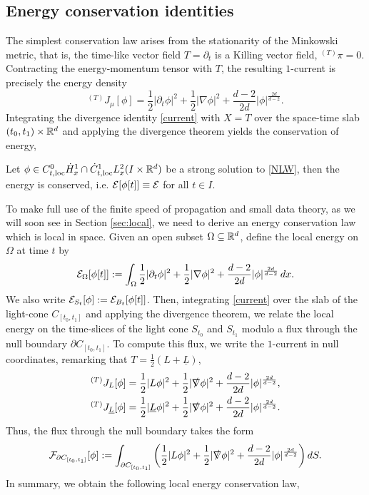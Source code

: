 	
\subsection{Energy conservation identities}
	
The simplest conservation law arises from the stationarity of the Minkowski metric, that is, the time-like vector field $T = \partial_t$ is a Killing vector field, $^{(T)} \pi = 0$. Contracting the energy-momentum tensor with $T$, the resulting $1$-current is precisely the energy density
	\[
		^{(T)} J_\mu [\phi]
			= \frac12 |\partial_t \phi|^2 + \frac12 |\nabla \phi|^2 + \frac{d - 2}{2d} |\phi|^{\frac{2d}{d - 2}} .
	\]
Integrating the divergence identity \eqref{current} with $X = T$ over the space-time slab $(t_0, t_1) \times \mathbb R^d$ and applying the divergence theorem yields the conservation of energy,	

\begin{proposition}
	Let $\phi \in C^0_{t, \mathrm{loc}} \dot H^1_x \cap \dot C^1_{t, \mathrm{loc}} L^2_x (I \times \mathbb R^d)$ be a strong solution to \eqref{NLW}, then the energy is conserved, i.e. $\mathcal E[\phi[t]] \equiv \mathcal E$ for all $t \in I$. 
\end{proposition}
	
To make full use of the finite speed of propagation and small data theory, as we will soon see in Section \ref{sec:local}, we need to derive an energy conservation law which is local in space. Given an open subset $\Omega \subseteq \mathbb R^d$, define the local energy on $\Omega$ at time $t$ by
	\[
		\mathcal E_\Omega [\phi[t]] 
			:= \int_\Omega \frac12 |\partial_t \phi|^2 + \frac12 |\nabla \phi|^2 +  \frac{d - 2}{2d} |\phi|^{\frac{2d}{d - 2}} \, dx.
	\]	
We also write $\mathcal E_{S_t} [\phi] := \mathcal E_{B_t} [\phi[t]]$. Then, integrating \eqref{current} over the slab of the light-cone $C_{[t_0, t_1]}$ and applying the divergence theorem, we relate the local energy on the time-slices of the light cone $S_{t_0}$ and $S_{t_1}$ modulo a flux through the null boundary $\partial C_{[t_0, t_1]}$. To compute this flux, we write the $1$-current in null coordinates, remarking that $T = \tfrac12 (L + \underline L)$, 
	\begin{align*}
		{^{(T)}} J_L [\phi]
			&= \frac12 |L\phi|^2 + \frac12 |\slashed \nabla \phi|^2 +\frac{d - 2}{2d} |\phi|^{\frac{2d}{d - 2}} ,\\
		{^{(T)}} J_{\underline L} [\phi]
			&= \frac12 |\underline L\phi|^2 + \frac12 |\slashed \nabla \phi|^2 +\frac{d - 2}{2d} |\phi|^{\frac{2d}{d - 2}} .	
	\end{align*}
Thus, the flux through the null boundary takes the form 
	\[
		\mathcal F_{\partial C_{[t_0, t_1]}} [\phi]
			:= \int_{\partial C_{[t_0, t_1]}} \left( \frac12 |L \phi|^2 + \frac12 |\slashed \nabla \phi|^2 + \frac{d - 2}{2d} |\phi|^{\frac{2d}{d - 2}}  \right) dS.
	\]
In summary, we obtain the following local energy conservation law, 




